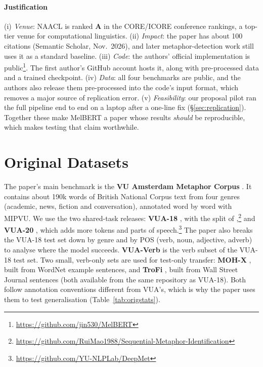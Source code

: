 \documentclass[11pt]{article}
\begin{document}
\paragraph{Justification} (i) \emph{Venue}: NAACL is ranked \textbf{A} in the CORE/ICORE conference rankings, a top-tier venue for computational linguistics. (ii) \emph{Impact}: the paper has about 100 citations (Semantic Scholar, Nov.~2026), and later metaphor-detection work still uses it as a standard baseline. (iii) \emph{Code}: the authors' official implementation is public\footnote{\url{https://github.com/jin530/MelBERT}}. The first author's GitHub account hosts it, along with pre-processed data and a trained checkpoint. (iv) \emph{Data}: all four benchmarks are public, and the authors also release them pre-processed into the code's input format, which removes a major source of replication error. (v) \emph{Feasibility}: our proposal pilot ran the full pipeline end to end on a laptop after a one-line fix (\S\ref{sec:replication}). Together these make MelBERT a paper whose results \emph{should} be reproducible, which makes testing that claim worthwhile.

\section{Original Datasets}
\label{sec:origdata}

The paper's main benchmark is the \textbf{VU Amsterdam Metaphor Corpus} \citep[VUAMC;][]{steen2010method}. It contains about 190k words of British National Corpus text from four genres (academic, news, fiction and conversation), annotated word by word with MIPVU. We use the two shared-task releases: \textbf{VUA-18} \citep{leong-etal-2018-report}, with the split of \citet{mao-etal-2019-end},\footnote{\url{https://github.com/RuiMao1988/Sequential-Metaphor-Identification}} and \textbf{VUA-20} \citep{leong-etal-2020-report}, which adds more tokens and parts of speech.\footnote{\url{https://github.com/YU-NLPLab/DeepMet}} The paper also breaks the VUA-18 test set down by genre and by POS (verb, noun, adjective, adverb) to analyse where the model succeeds. \textbf{VUA-Verb} is the verb subset of the VUA-18 test set. Two small, verb-only sets are used for test-only transfer: \textbf{MOH-X} \citep{mohammad-etal-2016-metaphor}, built from WordNet example sentences, and \textbf{TroFi} \citep{birke-sarkar-2006-clustering}, built from Wall Street Journal sentences (both available from the same repository as VUA-18). Both follow annotation conventions different from VUA's, which is why the paper uses them to test generalisation (Table~\ref{tab:origstats}).
\end{document}

